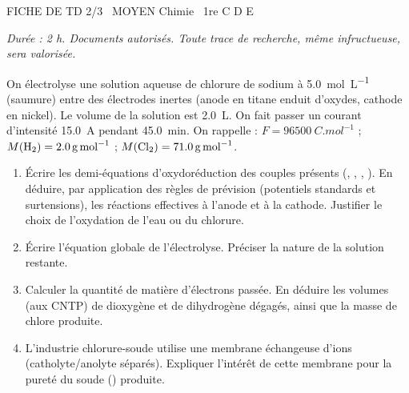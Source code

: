 \documentclass[11pt]{article}
\begin{document}
\begin{tcolorbox}[enhanced,colback=popink,colframe=popink,arc=10pt,boxrule=0pt,left=12pt,right=12pt,top=9pt,bottom=9pt]
{\color{white}\popxbold\small FICHE DE TD 2/3 \textbullet\ MOYEN \hfill Chimie \textbullet\ 1re C D E\par}
\end{tcolorbox}
\vspace{4pt}
\emph{Durée : 2 h. Documents autorisés. Toute trace de recherche, même infructueuse, sera valorisée.}

\begin{exercice}
On électrolyse une solution aqueuse de chlorure de sodium  à \SI{5,0}{mol.L^{-1}} (saumure) entre des électrodes inertes (anode en titane enduit d'oxydes, cathode en nickel). Le volume de la solution est \SI{2,0}{L}. On fait passer un courant d'intensité \SI{15,0}{A} pendant \SI{45,0}{min}. On rappelle : $F = \SI{96500}{C.mol^{-1}}$ ; $M(\ce{H2}) = \SI{2,0}{g.mol^{-1}}$ ; $M(\ce{Cl2}) = \SI{71,0}{g.mol^{-1}}$.
\begin{enumerate}
    \item Écrire les demi-équations d'oxydoréduction des couples présents (, , , ). En déduire, par application des règles de prévision (potentiels standards et surtensions), les réactions effectives à l'anode et à la cathode. Justifier le choix de l'oxydation de l'eau ou du chlorure.
    \item Écrire l'équation globale de l'électrolyse. Préciser la nature de la solution restante.
    \item Calculer la quantité de matière d'électrons passée. En déduire les volumes (aux CNTP) de dioxygène et de dihydrogène dégagés, ainsi que la masse de chlore produite.
    \item L'industrie chlorure-soude utilise une membrane échangeuse d'ions (catholyte/anolyte séparés). Expliquer l'intérêt de cette membrane pour la pureté du soude () produite.
\end{enumerate}
\end{exercice}
\end{document}
